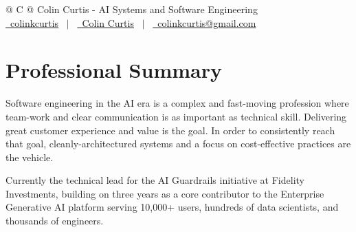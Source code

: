 \documentclass[a4paper,12pt]{article}
\begin{document}
\pagestyle{empty}



\begin{tabularx}{\linewidth}{@{} C @{}}
\Huge{Colin Curtis - AI Systems and Software Engineering} \\[7.5pt]
\href{https://github.com/colinkcurtis}{\raisebox{-0.05\height}\faGithub\ colinkcurtis} \ $|$ \
\href{https://www.linkedin.com/in/colinkcurtis/}{\raisebox{-0.05\height}\faLinkedin\ Colin Curtis} \ $|$ \
\href{mailto:colinkcurtis@gmail.com}{\raisebox{-0.05\height}\faEnvelope\ colinkcurtis@gmail.com}
\end{tabularx}


\section{Professional Summary}
Software engineering in the AI era is a complex and fast-moving profession where team-work and clear
communication is as important as technical skill. Delivering great customer experience and value
is the goal. In order to consistently reach that goal, cleanly-architectured systems
and a focus on cost-effective practices are the vehicle.

Currently the technical lead for the AI Guardrails initiative at Fidelity Investments,
building on three years as a core contributor to the Enterprise Generative AI platform serving 10,000+ users,
hundreds of data scientists, and thousands of engineers.

\end{document}
